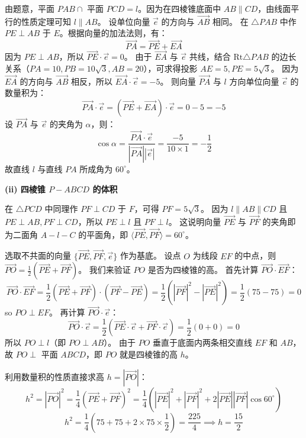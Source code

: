 {由题意，平面 $PAB \cap$ 平面 $PCD = l$。因为在四棱锥底面中 $AB \parallel CD$，由线面平行的性质定理可知 $l \parallel AB$。
设单位向量 $\vec{e}$ 的方向与 $\overrightarrow{AB}$ 相同。
在 $\triangle PAB$ 中作 $PE \perp AB$ 于 $E$。根据向量的加法法则，有：
\[ \overrightarrow{PA} = \overrightarrow{PE} + \overrightarrow{EA} \]
因为 $PE \perp AB$，所以 $\overrightarrow{PE} \cdot \vec{e} = 0$。
由于 $\overrightarrow{EA}$ 与 $\vec{e}$ 共线，结合 $\mathrm{Rt}\triangle PAB$ 的边长关系（$PA=10, PB=10\sqrt{3}, AB=20$），可求得投影 $AE = 5, PE = 5\sqrt{3}$。
因为 $\overrightarrow{EA}$ 的方向与 $\overrightarrow{AB}$ 相反，所以 $\overrightarrow{EA} \cdot \vec{e} = -5$。
则向量 $\overrightarrow{PA}$ 与 $l$ 方向单位向量 $\vec{e}$ 的数量积为：
\[ \overrightarrow{PA} \cdot \vec{e} = (\overrightarrow{PE} + \overrightarrow{EA}) \cdot \vec{e} = 0 - 5 = -5 \]
设 $\overrightarrow{PA}$ 与 $\vec{e}$ 的夹角为 $\alpha$，则：
\[ \cos \alpha = \frac{\overrightarrow{PA} \cdot \vec{e}}{|\overrightarrow{PA}| |\vec{e}|} = \frac{-5}{10 \times 1} = -\frac{1}{2} \]
故直线 $l$ 与直线 $PA$ 所成角为 $60^\circ$。

\textbf{(ii) 四棱锥 $P-ABCD$ 的体积}

在 $\triangle PCD$ 中同理作 $PF \perp CD$ 于 $F$，可得 $PF = 5\sqrt{3}$。
因为 $l \parallel AB \parallel CD$ 且 $PE \perp AB, PF \perp CD$，所以 $PE \perp l$ 且 $PF \perp l$。
这说明向量 $\overrightarrow{PE}$ 与 $\overrightarrow{PF}$ 的夹角即为二面角 $A-l-C$ 的平面角，即 $\langle \overrightarrow{PE}, \overrightarrow{PF} \rangle = 60^\circ$。

选取不共面的向量 $\{\overrightarrow{PE}, \overrightarrow{PF}, \vec{e}\}$ 作为基底。
设点 $O$ 为线段 $EF$ 的中点，则 $\overrightarrow{PO} = \frac{1}{2}(\overrightarrow{PE} + \overrightarrow{PF})$。
我们来验证 $PO$ 是否为四棱锥的高。
首先计算 $\overrightarrow{PO} \cdot \overrightarrow{EF}$：
\[
\overrightarrow{PO} \cdot \overrightarrow{EF} = \frac{1}{2}(\overrightarrow{PE} + \overrightarrow{PF}) \cdot (\overrightarrow{PF} - \overrightarrow{PE}) = \frac{1}{2}(|\overrightarrow{PF}|^2 - |\overrightarrow{PE}|^2) = \frac{1}{2}(75 - 75) = 0
\]
so $PO \perp EF$。
再计算 $\overrightarrow{PO} \cdot \vec{e}$：
\[
\overrightarrow{PO} \cdot \vec{e} = \frac{1}{2}(\overrightarrow{PE} \cdot \vec{e} + \overrightarrow{PF} \cdot \vec{e}) = \frac{1}{2}(0 + 0) = 0
\]
所以 $PO \perp l$（即 $PO \perp AB$）。
由于 $PO$ 垂直于底面内两条相交直线 $EF$ 和 $AB$，故 $PO \perp$ 平面 $ABCD$，即 $PO$ 就是四棱锥的高 $h$。

利用数量积的性质直接求高 $h = |\overrightarrow{PO}|$：
\[
h^2 = |\overrightarrow{PO}|^2 = \frac{1}{4}(\overrightarrow{PE} + \overrightarrow{PF})^2 = \frac{1}{4}\left(|\overrightarrow{PE}|^2 + |\overrightarrow{PF}|^2 + 2|\overrightarrow{PE}||\overrightarrow{PF}|\cos 60^\circ\right)
\]
\[
h^2 = \frac{1}{4}\left(75 + 75 + 2 \times 75 \times \frac{1}{2}\right) = \frac{225}{4} \implies h = \frac{15}{2}
\]

}
